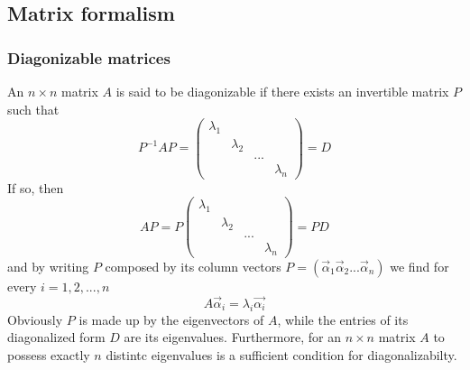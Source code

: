 \documentclass[11.5pt,a4paper]{article}
\begin{document}
\subsection{Matrix formalism}

\subsubsection{Diagonizable matrices}
An $n \times n$ matrix $A$ is said to be diagonizable if there exists an invertible matrix $P$ such that
\begin{equation}
 P^{-1} A P = \begin{pmatrix} 
		\lambda_1 & & & \\
		& \lambda_2 & & \\
		& & \text{...} & \\
		& & & \lambda_n
              \end{pmatrix} = D
\end{equation}
If so, then 
\begin{equation}
 A P = P \begin{pmatrix} 
		\lambda_1 & & & \\
		& \lambda_2 & & \\
		& & \text{...} & \\
		& & & \lambda_n
              \end{pmatrix} = P D
\end{equation}
and by writing $P$ composed by its column vectors $P = ( \vec{\alpha}_1 \vec{\alpha}_2 ... \vec{\alpha}_n)$ we find for every $i = 1,2,...,n$
\begin{equation}
 A \vec{\alpha}_i = \lambda_i \vec{\alpha_i}
\end{equation}
Obviously $P$ is made up by the eigenvectors of $A$, while the entries of its diagonalized form $D$ are its eigenvalues. Furthermore, for an $n \times n$ matrix $A$ to possess exactly $n$ distintc eigenvalues is a sufficient condition for diagonalizabilty.
\end{document}
